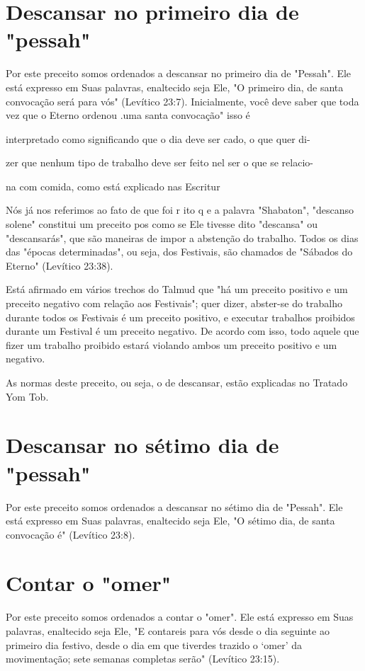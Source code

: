 \begin{itemize}
\begin{enumrate}
\begin{itemize}
\begin{itemize}
\begin{itemize}
\section{Descansar no primeiro dia de "pessah"}

Por este preceito somos ordenados a descansar no primeiro dia de
"Pessah". Ele está expresso em Suas palavras, enaltecido seja Ele, "O
primeiro dia, de santa convocação será para vós" (Levítico 23:7).
Inicialmente, você de­ve saber que toda vez que o Eterno ordenou
.uma santa convocação" isso é

interpretado como significando que o dia deve ser cado, o que quer di-

zer que nenhum tipo de trabalho deve ser feito nel ser o que se relacio-

na com comida, como está explicado nas Escritur

Nós já nos referimos ao fato de que foi r ito q e a palavra "Shaba­ton",
"descanso solene" constitui um preceito pos como se Ele tivesse dito
"descansa" ou "descansarás", que são maneiras de impor a abstenção do
trabalho. Todos os dias das "épocas determinadas", ou seja, dos
Festivais, são chamados de "Sábados do Eterno" (Levítico 23:38).

Está afirmado em vários trechos do Talmud que "há um preceito po­sitivo
e um preceito negativo com relação aos Festivais"; quer dizer, abster-se
do trabalho durante todos os Festivais é um preceito positivo, e
executar traba­lhos proibidos durante um Festival é um preceito
negativo. De acordo com is­so, todo aquele que fizer um trabalho
proibido estará violando ambos um pre­ceito positivo e um negativo.

As normas deste preceito, ou seja, o de descansar, estão explicadas no
Tratado Yom Tob.

\section{Descansar no sétimo dia de "pessah"}

Por este preceito somos ordenados a descansar no sétimo dia de
"Pes­sah". Ele está expresso em Suas palavras, enaltecido seja Ele, "O
sétimo dia, de santa convocação é" (Levítico 23:8).

\section{Contar o "omer"}

Por este preceito somos ordenados a contar o "omer". Ele está ex­presso
em Suas palavras, enaltecido seja Ele, "E contareis para vós desde o dia
seguinte ao primeiro dia festivo, desde o dia em que tiverdes trazido o
`omer' da movimentação; sete semanas completas serão" (Levítico 23:15).



\end{itemize}
\end{itemize}
\end{itemize}
\end{enumrate}
\end{itemize}
